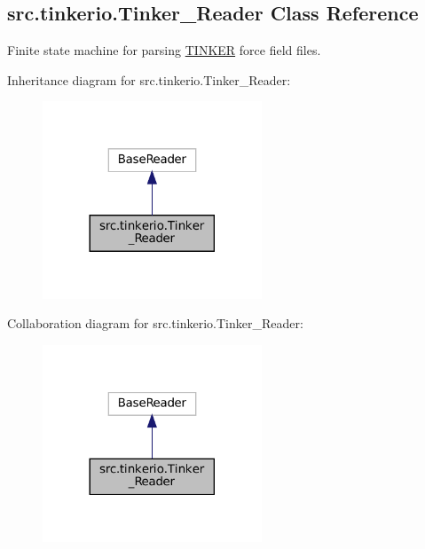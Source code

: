 \hypertarget{classsrc_1_1tinkerio_1_1Tinker__Reader}{}\subsection{src.\+tinkerio.\+Tinker\+\_\+\+Reader Class Reference}
\label{classsrc_1_1tinkerio_1_1Tinker__Reader}


Finite state machine for parsing \hyperlink{classsrc_1_1tinkerio_1_1TINKER}{T\+I\+N\+K\+ER} force field files.  




Inheritance diagram for src.\+tinkerio.\+Tinker\+\_\+\+Reader\+:
\nopagebreak
\begin{figure}[H]
\begin{center}
\leavevmode
\includegraphics[width=185pt]{classsrc_1_1tinkerio_1_1Tinker__Reader__inherit__graph}
\end{center}
\end{figure}


Collaboration diagram for src.\+tinkerio.\+Tinker\+\_\+\+Reader\+:
\nopagebreak
\begin{figure}[H]
\begin{center}
\leavevmode
\includegraphics[width=185pt]{classsrc_1_1tinkerio_1_1Tinker__Reader__coll__graph}
\end{center}
\end{figure}

